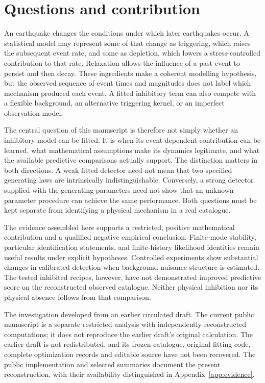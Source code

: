 \chapter{Questions and contribution}
\label{ch:introduction}

An earthquake changes the conditions under which later earthquakes occur. A statistical model may represent some of that change as triggering, which raises the subsequent event rate, and some as depletion, which lowers a stress-controlled contribution to that rate. Relaxation allows the influence of a past event to persist and then decay. These ingredients make a coherent modelling hypothesis, but the observed sequence of event times and magnitudes does not label which mechanism produced each event. A fitted inhibitory term can also compete with a flexible background, an alternative triggering kernel, or an imperfect observation model.

The central question of this manuscript is therefore not simply whether an inhibitory model can be fitted. It is when its event-dependent contribution can be learned, what mathematical assumptions make its dynamics legitimate, and what the available predictive comparisons actually support. The distinction matters in both directions. A weak fitted detector need not mean that two specified generating laws are intrinsically indistinguishable. Conversely, a strong detector supplied with the generating parameters need not show that an unknown-parameter procedure can achieve the same performance. Both questions must be kept separate from identifying a physical mechanism in a real catalogue.

The evidence assembled here supports a restricted, positive mathematical contribution and a qualified negative empirical conclusion. Finite-mode stability, particular identification statements, and finite-history likelihood identities remain useful results under explicit hypotheses. Controlled experiments show substantial changes in calibrated detection when background nuisance structure is estimated. The tested inhibited recipes, however, have not demonstrated improved predictive score on the reconstructed observed catalogue. Neither physical inhibition nor its physical absence follows from that comparison.

The investigation developed from an earlier circulated draft. The current public manuscript is a separate restricted analysis with independently reconstructed computations; it does not reproduce the earlier draft's original calculation. The earlier draft is not redistributed, and its frozen catalogue, original fitting code, complete optimization records and editable source have not been recovered. The public implementation and selected summaries document the present reconstruction, with their availability distinguished in Appendix~\ref{app:evidence}.

